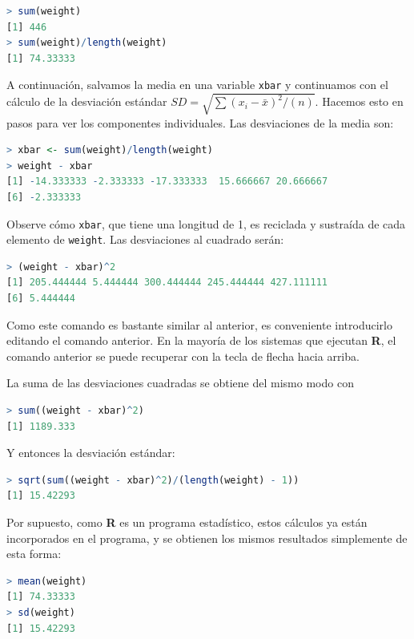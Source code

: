 \documentclass[spanish]{extbook}
\numberwithin{equation}{section}
\numberwithin{figure}{section}
\begin{document}
\begin{lstlisting}[language=R]
> sum(weight)
[1] 446
> sum(weight)/length(weight)
[1] 74.33333
\end{lstlisting}

A continuación, salvamos la media en una variable \texttt{xbar} y continuamos
con el cálculo de la desviación estándar $SD = \sqrt{\sum (x_i -\bar{x})^2/(n)}$. 
Hacemos esto en pasos para ver los componentes individuales. Las desviaciones 
de la media son: 

\begin{lstlisting}[language=R]
> xbar <- sum(weight)/length(weight)
> weight - xbar
[1] -14.333333 -2.333333 -17.333333  15.666667 20.666667
[6] -2.333333 
\end{lstlisting}

Observe cómo \texttt{xbar}, que tiene una longitud de 1, es reciclada y
sustraída de cada elemento de \texttt{weight}. Las desviaciones al cuadrado
serán:

\begin{lstlisting}[language=R]
> (weight - xbar)^2
[1] 205.444444 5.444444 300.444444 245.444444 427.111111
[6] 5.444444
\end{lstlisting}

Como este comando es bastante similar al anterior, es conveniente introducirlo
editando el comando anterior. En la mayoría de los sistemas que ejecutan
\textbf{R}, el comando anterior se puede recuperar con la tecla de flecha hacia
arriba. 

La suma de las desviaciones cuadradas se obtiene del mismo modo con

\begin{lstlisting}[language=R]
> sum((weight - xbar)^2)
[1] 1189.333
\end{lstlisting}

Y entonces la desviación estándar:

\begin{lstlisting}[language=R]
> sqrt(sum((weight - xbar)^2)/(length(weight) - 1))
[1] 15.42293
\end{lstlisting}

Por supuesto, como \textbf{R} es un programa estadístico, estos cálculos ya
están incorporados en el programa, y se obtienen los mismos resultados
simplemente de esta forma:

\begin{lstlisting}[language=R]
> mean(weight)
[1] 74.33333
> sd(weight)
[1] 15.42293
\end{lstlisting}
\end{document}
